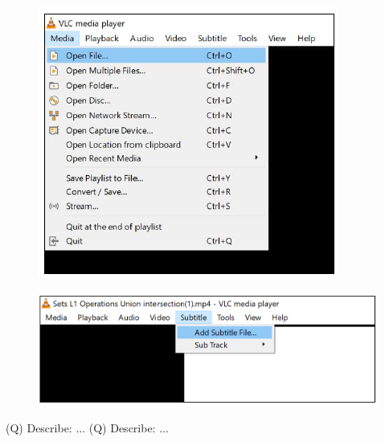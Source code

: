 \documentclass[12pt]{article}
\begin{document}
\begin{figure}[H]
\includegraphics[width=0.5\linewidth]{page1-image-3.png}
\end{figure}
\begin{figure}[H]
\includegraphics[width=0.5\linewidth]{page1-image-4.png}
\end{figure}
\clearpage
(Q)
Describe: ...
\clearpage
\clearpage
(Q)
Describe: ...
\clearpage
\\
\end{document}
